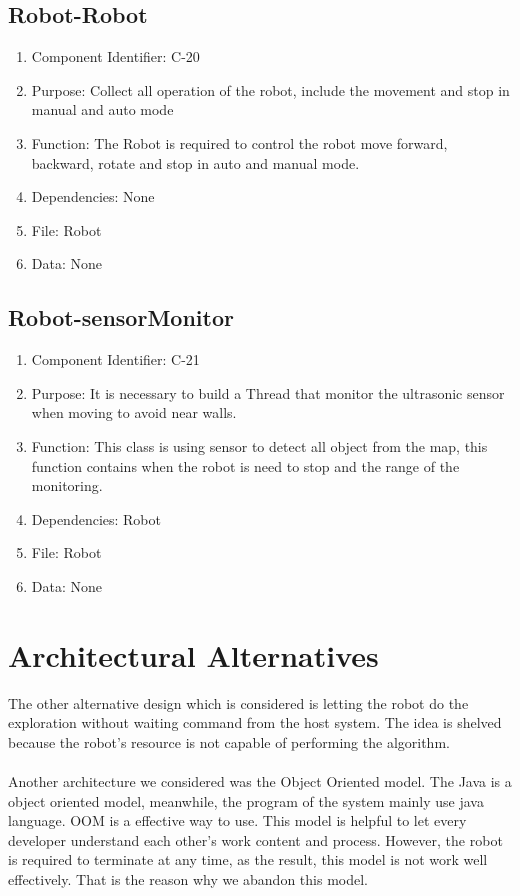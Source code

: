 \documentclass[11pt, a4paper]{report}
\begin{document}
\subsection{Robot-Robot}
\begin{enumerate}
\item Component Identifier: C-20
\item Purpose: Collect all operation of the robot, include the movement and stop in manual and auto mode
\item Function: The Robot is required to control the robot move forward, backward, rotate and stop in auto and manual mode.
\item Dependencies: None
\item File: Robot
\item Data: None
\end{enumerate}

\subsection{Robot-sensorMonitor}
\begin{enumerate}
\item Component Identifier: C-21
\item Purpose: It is necessary to build  a Thread that monitor the ultrasonic sensor when moving to avoid near walls. 
 \item Function: This class is using sensor to detect all object from the map, this function contains when the robot is need to stop and the range of the monitoring.
\item Dependencies: Robot
\item File: Robot
\item Data: None
\end{enumerate}



\section{Architectural Alternatives}
The other alternative design which is considered is letting the robot do the exploration without
waiting command from the host system. The idea is shelved because the robot's resource is not capable
of performing the  algorithm.\\ \\
Another architecture we considered was the Object Oriented model. The Java is a object oriented model, meanwhile, the program of the system mainly use java language. OOM is a effective way to use. This model is helpful to let every developer understand each other's work content and process. However, the robot is required to terminate at any time, as the result, this model is not work well effectively. That is the reason why we abandon this model.
\end{document}
